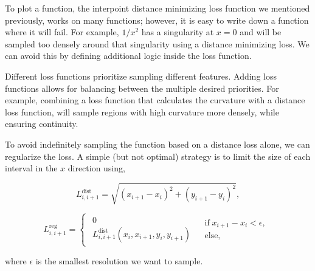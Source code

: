 
To plot a function, the interpoint distance minimizing loss function we mentioned previously, works on many functions; however, it is easy to write down a function where it will fail.
For example, $1/x^2$ has a singularity at $x=0$ and will be sampled too densely around that singularity using a distance minimizing loss.
We can avoid this by defining additional logic inside the loss function.


Different loss functions prioritize sampling different features.
Adding loss functions allows for balancing between the multiple desired priorities.
For example, combining a loss function that calculates the curvature with a distance loss function, will sample regions with high curvature more densely, while ensuring continuity.


To avoid indefinitely sampling the function based on a distance loss alone, we can regularize the loss.
A simple (but not optimal) strategy is to limit the size of each interval in the $x$ direction using,

\begin{equation*}
L_{i, i+1}^\textrm{dist}=\sqrt{(x_{i+1}-x_{i})^{2}+(y_{i+1}-y_{i})^{2}},
\end{equation*}

\begin{equation*}
L_{i,i+1}^\textrm{reg}=\begin{cases}
\begin{array}{c}
0\\
L_{i, i+1}^\textrm{dist}(x_i, x_{i+1}, y_i, y_{i+1})
\end{array} & \begin{array}{c}
\textrm{if} \; x_{i+1}-x_{i}<\epsilon,\\
\textrm{else,}
\end{array}\end{cases}
\end{equation*}

where $\epsilon$ is the smallest resolution we want to sample.


